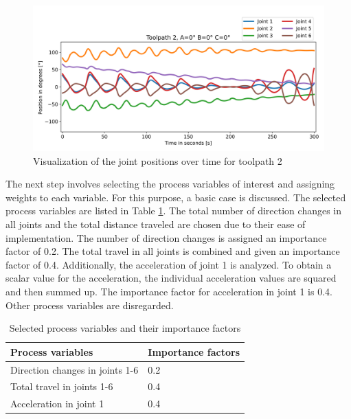 \begin{figure}[H]
	\centerline{\includegraphics[width=1\textwidth]{figures/TP2ABC0.png}}
	\caption{Visualization of the joint positions over time for toolpath 2}
	\label{TP2ABC0}
\end{figure}
\newpage
The next step involves selecting the process variables of interest and assigning weights to each variable. For this purpose, a basic case is discussed. The selected process variables are listed in Table \ref{PPbasic}. The total number of direction changes in all joints and the total distance traveled are chosen due to their ease of implementation. The number of direction changes is assigned an importance factor of 0.2.
The total travel in all joints is combined and given an importance factor of 0.4.
Additionally, the acceleration of joint 1 is analyzed. To obtain a scalar value for the acceleration, the individual acceleration values are squared and then summed up. The importance factor for acceleration in joint 1 is 0.4. Other process variables are disregarded.

\begin{table}[H]
	\centering
	\begin{tabular}{||l|l||}
		Process variables& Importance factors \\
		\hline
		\hline
		\hline
		Direction changes in joints 1-6	&		0.2 \\
		Total travel in joints 1-6	&  	0.4 \\
		Acceleration in joint 1	& 		0.4\\
		
		\hline
		\hline
	\end{tabular}
	
	\caption{Selected process variables and their importance factors}
	\label{PPbasic}
\end{table}


